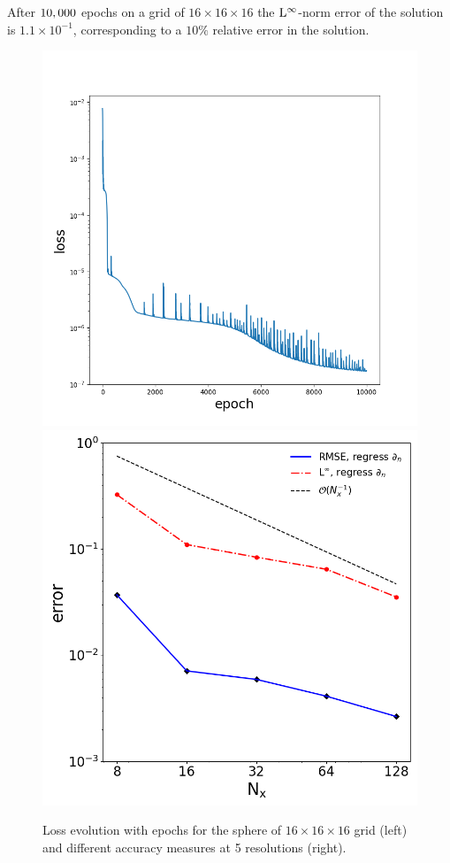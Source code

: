 \documentclass{elsarticle}
\begin{document}
After $\rm 10,000$ epochs on a grid of $16\times 16 \times 16$ the $\rm L^\infty$-norm error of the solution is $1.1\times 10^{-1}$, corresponding to a $10\%$ relative error in the solution.


\begin{figure}
	\centering
	\includegraphics[width=0.49\linewidth]{./figures/poisson_solver_loss_sphere_128x128x128.png}
	\includegraphics[width=0.45\linewidth]{./figures/case_I_regression.png}
	\caption{Loss evolution with epochs for the sphere of $16\times 16\times 16$ grid (left) and different accuracy measures at 5 resolutions (right).}
	\label{fig:losses}
\end{figure}
\end{document}
